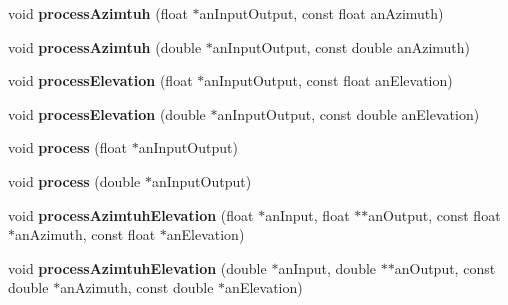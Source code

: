 \begin{DoxyCompactItemize}
\item 
\hypertarget{class_ambisonic_encoder3_d_ae01355930f9962a8e9fac4a704f92f18}{void {\bfseries process\-Azimtuh} (float $\ast$an\-Input\-Output, const float an\-Azimuth)}\label{class_ambisonic_encoder3_d_ae01355930f9962a8e9fac4a704f92f18}

\item 
\hypertarget{class_ambisonic_encoder3_d_a5b696db85abe47ab30049ea939bca1f7}{void {\bfseries process\-Azimtuh} (double $\ast$an\-Input\-Output, const double an\-Azimuth)}\label{class_ambisonic_encoder3_d_a5b696db85abe47ab30049ea939bca1f7}

\item 
\hypertarget{class_ambisonic_encoder3_d_abfffc7a6f334ff6376c996ce3e7ba1de}{void {\bfseries process\-Elevation} (float $\ast$an\-Input\-Output, const float an\-Elevation)}\label{class_ambisonic_encoder3_d_abfffc7a6f334ff6376c996ce3e7ba1de}

\item 
\hypertarget{class_ambisonic_encoder3_d_aed85258c9da839ec5e8140c2269781a4}{void {\bfseries process\-Elevation} (double $\ast$an\-Input\-Output, const double an\-Elevation)}\label{class_ambisonic_encoder3_d_aed85258c9da839ec5e8140c2269781a4}

\item 
\hypertarget{class_ambisonic_encoder3_d_a5423cc872050668d7aa72637d7e002ca}{void {\bfseries process} (float $\ast$an\-Input\-Output)}\label{class_ambisonic_encoder3_d_a5423cc872050668d7aa72637d7e002ca}

\item 
\hypertarget{class_ambisonic_encoder3_d_a9f33de7692761e81125a70ac4e712d42}{void {\bfseries process} (double $\ast$an\-Input\-Output)}\label{class_ambisonic_encoder3_d_a9f33de7692761e81125a70ac4e712d42}

\item 
\hypertarget{class_ambisonic_encoder3_d_a117375821fc414f692f07c09a289b36c}{void {\bfseries process\-Azimtuh\-Elevation} (float $\ast$an\-Input, float $\ast$$\ast$an\-Output, const float $\ast$an\-Azimuth, const float $\ast$an\-Elevation)}\label{class_ambisonic_encoder3_d_a117375821fc414f692f07c09a289b36c}

\item 
\hypertarget{class_ambisonic_encoder3_d_a5f0a91cc403d866a53d3f79f4c549c0d}{void {\bfseries process\-Azimtuh\-Elevation} (double $\ast$an\-Input, double $\ast$$\ast$an\-Output, const double $\ast$an\-Azimuth, const double $\ast$an\-Elevation)}\label{class_ambisonic_encoder3_d_a5f0a91cc403d866a53d3f79f4c549c0d}


\end{DoxyCompactItemize}
